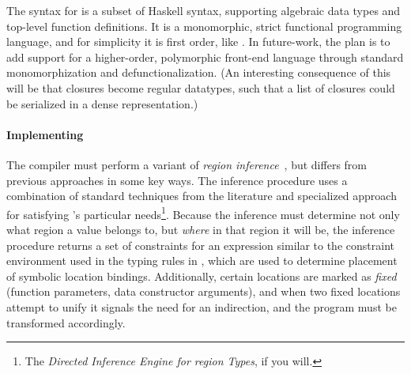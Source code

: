 {The syntax for \lamadt is a subset of Haskell syntax, supporting
  algebraic data types and top-level function definitions. It is a
  monomorphic, strict functional programming language, and for
  simplicity it is first order, like \ourcalc.}
{In future-work, the plan is to add support for a higher-order, polymorphic
  front-end language through standard monomorphization and defunctionalization.
  (An interesting consequence of this will be that closures become regular
  datatypes, such that a list of closures could be serialized in a dense
  representation.)}

%

\paragraph{Implementing \lamadt}
The compiler must perform a variant of {\em region
  inference}~\cite{regioncalcs,mlkit-retrospective}, but differs from
previous approaches in some key ways.
%
The inference procedure uses a combination of standard techniques from the literature and specialized
approach for satisfying \ourcalc's particular needs\footnote{The {\em
    Directed Inference Engine for region Types}, if you will.}.
%
Because the inference must determine
not only what region a value belongs to, but \emph{where} in that region it will
be, the inference procedure returns a set of constraints for an expression similar to the
constraint environment used in the typing rules in , which are
used to determine placement of symbolic location bindings. Additionally, certain locations
are marked as \emph{fixed} (function parameters, data constructor arguments), and when two
fixed locations attempt to unify it signals the need for an indirection, and the
program must be transformed accordingly.

